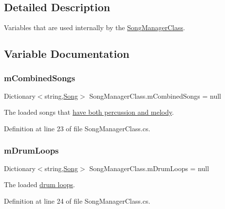 \subsection{Detailed Description}
Variables that are used internally by the \hyperlink{class_song_manager_class}{Song\+Manager\+Class}. 

\subsection{Variable Documentation}
\mbox{\label{group___s_m_priv_var_gaf6b4ff41b8da95d10ad3db62df111faa}} 
\subsubsection{\texorpdfstring{m\+Combined\+Songs}{mCombinedSongs}}
{\footnotesize\ttfamily Dictionary$<$string,\hyperlink{class_song}{Song}$>$ Song\+Manager\+Class.\+m\+Combined\+Songs = null\hspace{0.3cm}{\ttfamily [private]}}



The loaded songs that \hyperlink{group___song_group_DocSongCombined}{have both percussion and melody}. 



Definition at line 23 of file Song\+Manager\+Class.\+cs.

\mbox{\label{group___s_m_priv_var_ga84f25335035755448d11acb9287360f2}} 
\subsubsection{\texorpdfstring{m\+Drum\+Loops}{mDrumLoops}}
{\footnotesize\ttfamily Dictionary$<$string,\hyperlink{class_song}{Song}$>$ Song\+Manager\+Class.\+m\+Drum\+Loops = null\hspace{0.3cm}{\ttfamily [private]}}



The loaded \hyperlink{group___song_group_DocSongDrumLoop}{drum loops}. 



Definition at line 24 of file Song\+Manager\+Class.\+cs.

